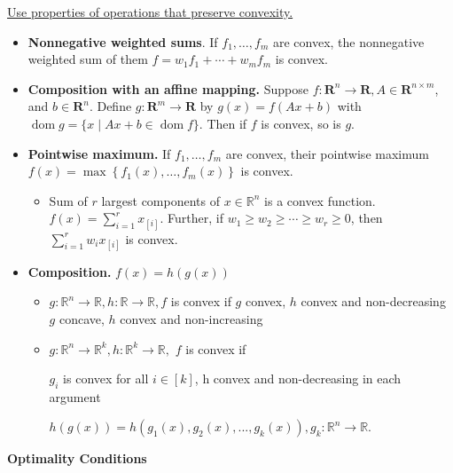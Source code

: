 \underline{Use properties of operations that preserve convexity.}

\begin{itemize}
    \item \textbf{Nonnegative weighted sums}. If $f_{1}, \ldots, f_{m}$ are convex, the nonnegative weighted sum of them $f=w_{1} f_{1}+\cdots+w_{m} f_{m}$ is convex.
    \item \textbf{Composition with an affine mapping.} Suppose $f: \mathbf{R}^{n} \rightarrow \mathbf{R}, A \in \mathbf{R}^{n \times m}$, and $b \in \mathbf{R}^{n}$. Define $g: \mathbf{R}^{m} \rightarrow \mathbf{R}$ by $g(x)=f(A x+b)$ with $\operatorname{dom} g=\{x \mid A x+b \in \operatorname{dom} f\}$. Then if $f$ is convex, so is $g$.
    \item \textbf{Pointwise maximum.} If $f_{1}, \ldots, f_{m}$ are convex, their pointwise maximum $f(x)=\max \left\{f_{1}(x), \ldots, f_{m}(x)\right\}$ is convex.
    \begin{itemize}
        \item Sum of $r$ largest components of $x \in \mathbb{R}^{n}$ is a convex function. $f(x)=\sum_{i=1}^{r} x_{[i]}$. Further, if $w_{1} \geq w_{2} \geq \cdots \geq w_{r} \geq 0$, then $\sum_{i=1}^{r} w_{i} x_{[i]}$ is convex.
    \end{itemize}
    
    \item \textbf{Composition.}  $f(x) = h(g(x))$
    \begin{itemize}
        \item $g: \mathbb{R}^{n} \rightarrow \mathbb{R}, h:\mathbb{R} \rightarrow \mathbb{R} , f$ is convex if
        \subitem $g$ convex, $h$ convex and non-decreasing
        \subitem $g$ concave, $h$ convex and non-increasing
        
        \item $g: \mathbb{R}^{n} \rightarrow \mathbb{R}^k, h:\mathbb{R}^k \rightarrow \mathbb{R},$ $f$ is convex if 
        
          $g_i$ is convex for all $i \in [k]$, h convex and non-decreasing in each argument
        
          $h(g(x)) = h\left(g_1(x), g_2(x), ..., g_k(x)\right), g_k:\mathbb{R}^n \rightarrow \mathbb{R}$. 
        
        
    \end{itemize}
    
\end{itemize}


{\LARGE \textbf{Optimality Conditions}}

